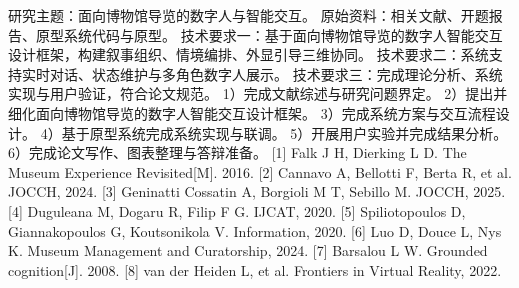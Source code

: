 \assignReq
{研究主题：面向博物馆导览的数字人与智能交互。}
{原始资料：相关文献、开题报告、原型系统代码与原型。}
{技术要求一：基于面向博物馆导览的数字人智能交互设计框架，构建叙事组织、情境编排、外显引导三维协同。}
{技术要求二：系统支持实时对话、状态维护与多角色数字人展示。}
{技术要求三：完成理论分析、系统实现与用户验证，符合论文规范。}
\assignWork
{1）完成文献综述与研究问题界定。}
{2）提出并细化面向博物馆导览的数字人智能交互设计框架。}
{3）完成系统方案与交互流程设计。}
{4）基于原型系统完成系统实现与联调。}
{5）开展用户实验并完成结果分析。}
{6）完成论文写作、图表整理与答辩准备。}
\assignRef
{[1] Falk J H, Dierking L D. The Museum Experience Revisited[M]. 2016.}
{[2] Cannavo A, Bellotti F, Berta R, et al. JOCCH, 2024.}
{[3] Geninatti Cossatin A, Borgioli M T, Sebillo M. JOCCH, 2025.}
{[4] Duguleana M, Dogaru R, Filip F G. IJCAT, 2020.}
{[5] Spiliotopoulos D, Giannakopoulos G, Koutsonikola V. Information, 2020.}
{[6] Luo D, Douce L, Nys K. Museum Management and Curatorship, 2024.}
{[7] Barsalou L W. Grounded cognition[J]. 2008.}
{[8] van der Heiden L, et al. Frontiers in Virtual Reality, 2022.}
